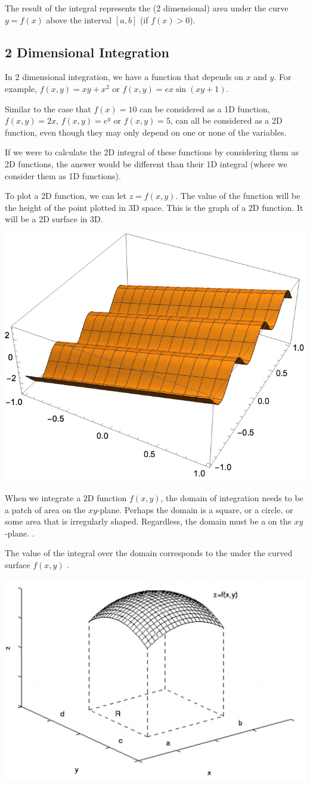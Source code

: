 \documentclass[11pt,fleqn]{book} %
\begin{document}
The result of the integral represents the (2 dimensional) area under the curve $y = f(x)$ above the interval $[a, b]$ (if $f(x) > 0$).

\subsection*{2 Dimensional Integration}

In 2 dimensional integration, we have a function that depends on $x$ and $y$. For example, $f(x, y) = xy + x^2$ or $f(x, y) = e x \sin(xy + 1)$. 

Similar to the case that $f(x) = 10$ can be considered as a 1D function, $f(x, y) = 2x$, $f(x, y) = e^y$ or $f(x, y) = 5$, can all be considered as a 2D function, even though they may only depend on one or none of the variables.

If we were to calculate the 2D integral of these functions by considering them as 2D functions, the answer would be different than their 1D integral (where we consider them as 1D functions).

To plot a 2D function, we can let $z = f(x, y)$. The value of the function will be the height of the point plotted in 3D space. This is the graph of a 2D function. It will be a 2D surface in 3D.

\begin{center} \includegraphics[width=0.275\linewidth]{Plots/s_4_1/sin(y)+2x.png} \end{center}

When we integrate a 2D function $f(x, y)$, the domain of integration needs to be a patch of area on the $xy$-plane. Perhaps the domain is a square, or a circle, or some area that is irregularly shaped. Regardless, the domain must be a  on the $xy$-plane. .

The value of the integral over the domain corresponds to the  under the curved surface $f(x, y)$ .

\begin{center} \includegraphics[width=0.75\linewidth]{Plots/s_4_1/Integral.png} \end{center}
\end{document}
